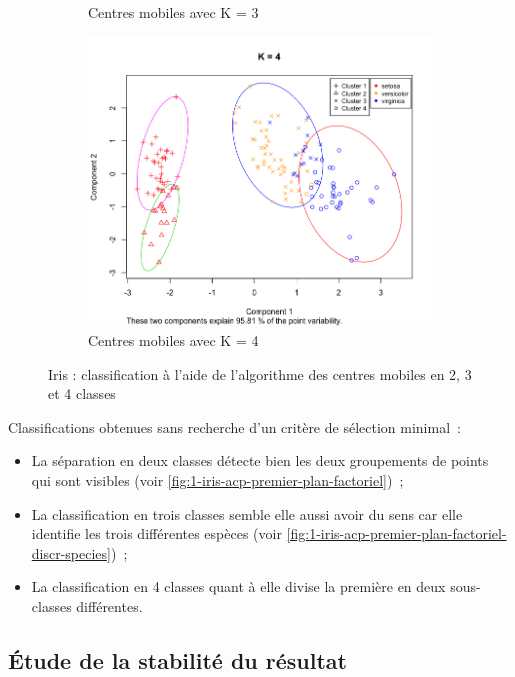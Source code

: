 \documentclass[a4paper,10pt]{report}
\begin{document}
\begin{figure}[H]
\begin{subfigure}[b]{0.33\linewidth}
		\caption{\small Centres mobiles avec K = 3}
		\label{fig:3-1-1-iris-kmeans-3}
	\end{subfigure}%
	\begin{subfigure}[b]{0.33\linewidth}
		\centering
		\captionsetup{justification=centering}
		\includegraphics[width=1\linewidth]{img/3-1-1-iris-kmeans-4}
		\caption{\small Centres mobiles avec K = 4}
		\label{fig:3-1-1-iris-kmeans-4}
	\end{subfigure}%
	\caption{\small Iris : classification à l'aide de l'algorithme des centres mobiles en 2, 3 et 4 classes}
	\label{fig:3-1-1-kmeans-iris-en-2-3-4-classes}%
\end{figure}

Classifications obtenues sans recherche d'un critère de sélection minimal~:
\begin{itemize}
	\item La séparation en deux classes détecte bien les deux groupements de points qui sont visibles (voir \autoref{fig:1-iris-acp-premier-plan-factoriel})~;
	\item La classification en trois classes semble elle aussi avoir du sens car elle identifie les trois différentes espèces (voir \autoref{fig:1-iris-acp-premier-plan-factoriel-discr-species})~;
	\item La classification en 4 classes quant à elle divise la première en deux sous-classes différentes.
\end{itemize}

\subsection{Étude de la stabilité du résultat}
\end{document}
